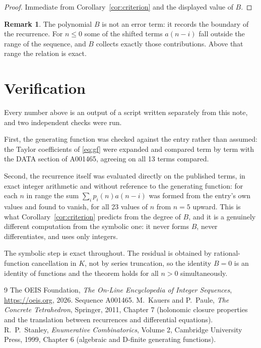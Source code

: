 \documentclass[11pt,a4paper]{article}
\theoremstyle{plain}
\theoremstyle{definition}
\newtheorem{remark}[theorem]{Remark}
\begin{document}
\begin{proof}
Immediate from Corollary~\ref{cor:criterion} and the displayed value of $B$.
\end{proof}

\begin{remark}
The polynomial $B$ is not an error term: it records the boundary of the recurrence. For
$n\le0$ some of the shifted terms $a(n-i)$ fall outside the range of the sequence,
and $B$ collects exactly those contributions. Above that range the relation is exact.
\end{remark}

\section{Verification}

Every number above is an output of a script written separately from this note, and two
independent checks were run.

First, the generating function was checked against the entry rather than assumed: the
Taylor coefficients of \eqref{eq:gf} were expanded and compared term by term with the DATA
section of A001465, agreeing on all 13 terms compared.

Second, the recurrence itself was evaluated directly on the published terms, in exact
integer arithmetic and without reference to the generating function: for each $n$ in range
the sum $\sum_{i}p_{i}(n)a(n-i)$ was formed from the entry's own values and found to
vanish, for all 23 values of $n$ from $n=5$ upward. This is what
Corollary~\ref{cor:criterion} predicts from the degree of $B$, and it is a genuinely
different computation from the symbolic one: it never forms $B$, never differentiates, and
uses only integers.

The symbolic step is exact throughout. The residual is obtained by rational-function
cancellation in $K$, not by series truncation, so the identity $B=0$ is an
identity of functions and the theorem holds for all $n>0$ simultaneously.

\begin{thebibliography}{9}
 The OEIS Foundation, \emph{The On-Line Encyclopedia of Integer Sequences},
\url{https://oeis.org}, 2026. Sequence A001465.
 M.~Kauers and P.~Paule, \emph{The Concrete Tetrahedron}, Springer, 2011,
Chapter 7 (holonomic closure properties and the translation between recurrences and
differential equations).
 R.~P.~Stanley, \emph{Enumerative Combinatorics}, Volume 2, Cambridge
University Press, 1999, Chapter 6 (algebraic and D-finite generating functions).
\end{thebibliography}
\end{document}
